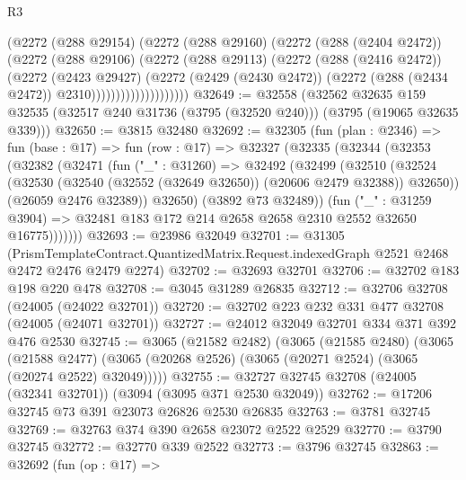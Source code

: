 \begin{lexlean}{R3}
\begin{coremodule}
                          (@2272
                            (@288 @29154)
                            (@2272
                              (@288 @29160)
                              (@2272
                                (@288 (@2404 @2472))
                                (@2272
                                  (@288 @29106)
                                  (@2272
                                    (@288 @29113)
                                    (@2272
                                      (@288 (@2416 @2472))
                                      (@2272
                                        (@2423 @29427)
                                        (@2272
                                          (@2429 (@2430 @2472))
                                          (@2272 (@288 (@2434 @2472)) @2310))))))))))))))))))))
@32649 := @32558
    (@32562
      @32635
      @159
      @32535
      (@32517 @240 @31736 (@3795 (@32520 @240)))
      (@3795 (@19065 @32635 @339)))
@32650 := @3815 @32480
@32692 := @32305
    (fun (plan : @2346) =>
    fun (base : @17) =>
    fun (row : @17) =>
    @32327
      (@32335
        (@32344
          (@32353
            (@32382
              (@32471
                (fun ("_" : @31260) =>
                @32492
                  (@32499
                    (@32510
                      (@32524
                        (@32530 (@32540 (@32552 (@32649 @32650)) (@20606 @2479 @32388)) @32650))
                      (@26059 @2476 @32389))
                    @32650)
                  (@3892 @73 @32489))
                (fun ("_" : @31259 @3904) =>
                @32481 @183 @172 @214 @2658 @2658 @2310 @2552 @32650 @16775)))))))
@32693 := @23986 @32049
@32701 := @31305
    (PrismTemplateContract.QuantizedMatrix.Request.indexedGraph @2521 @2468 @2472 @2476 @2479 @2274)
@32702 := @32693 @32701
@32706 := @32702 @183 @198 @220 @478
@32708 := @3045 @31289 @26835
@32712 := @32706 @32708 (@24005 (@24022 @32701))
@32720 := @32702 @223 @232 @331 @477 @32708 (@24005 (@24071 @32701))
@32727 := @24012 @32049 @32701 @334 @371 @392 @476 @2530
@32745 := @3065
    (@21582 @2482)
    (@3065
      (@21585 @2480)
      (@3065
        (@21588 @2477)
        (@3065 (@20268 @2526) (@3065 (@20271 @2524) (@3065 (@20274 @2522) @32049)))))
@32755 := @32727 @32745 @32708 (@24005 (@32341 @32701)) (@3094 (@3095 @371 @2530 @32049))
@32762 := @17206 @32745 @73 @391 @23073 @26826 @2530 @26835
@32763 := @3781 @32745
@32769 := @32763 @374 @390 @2658 @23072 @2522 @2529
@32770 := @3790 @32745
@32772 := @32770 @339 @2522
@32773 := @3796 @32745
@32863 := @32692
    (fun (op : @17) =>

\end{coremodule}
\end{lexlean}
